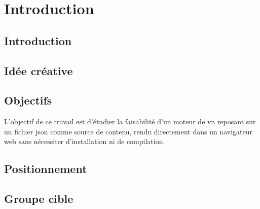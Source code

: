 \section{Introduction}

\subsection{Introduction}




\subsection{Idée créative}




\subsection{Objectifs}

L'objectif de ce travail est d'étudier la faisabilité d'un moteur de \gls{vn} reposant sur un fichier \gls{json} comme source de contenu, rendu directement dans un navigateur web sans nécessiter d'installation ni de compilation.


\subsection{Positionnement}




\subsection{Groupe cible}

